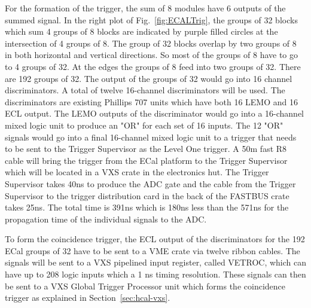 \documentclass{article}
\begin{document}
For the formation of the trigger, the sum of 8 modules have 6 outputs of the summed signal.
In the right plot of Fig.~\ref{fig:ECALTrig}, the groups of 32 blocks which sum 4 groups of
8 blocks are indicated by purple filled circles at the intersection of 4 groups of 8. 
The group of 32 blocks overlap
by two groups of 8 in both horizontal and vertical directions. So most of the
groups of 8 have to go to 4 groups of 32. At the edges the groups of 8 feed into
two groups of 32. There are 192  groups of 32. The output of the groups of 32 would go into 16 channel
discriminators. A total of twelve 16-channel discriminators will be used.
The discriminators are existing Phillips 707 units which have both 
16 LEMO and 16 ECL output. The  LEMO outputs of the
discriminator would go into a 16-channel mixed logic unit to produce an "OR" for each set of
16 inputs. The 12 "OR" signals would go into a final 16-channel mixed logic unit to 
a trigger that needs to be sent to the Trigger Supervisor as the Level One trigger. A 50m fast R8 cable will bring the trigger from the ECal platform to the Trigger Supervisor
which will be located in a VXS crate in the electronics hut. The Trigger Supervisor
takes 40ns to produce the ADC gate and the cable from the Trigger Supervisor to the
trigger distribution card in the back of the FASTBUS crate takes 25ns. The total time
is 391ns which is 180ns less than the 571ns for the propagation time of the individual
signals to the ADC.

To form the coincidence trigger, the ECL output of the discriminators for the 192 
ECal groups of 32 have to be sent to a VME crate via  twelve ribbon cables.
The signals will be sent to a VXS pipelined input register, called VETROC, which
can have up to 208 logic inputs which a 1 ns timing resolution. 
These signals can then be sent to a VXS Global Trigger Processor unit which
forms the coincidence trigger as explained in Section~\ref{sec:hcal-vxs}.
\end{document}
